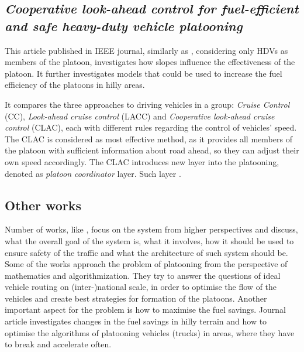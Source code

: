 \subsection{\textit{Cooperative look-ahead control for fuel-efficient and safe heavy-duty vehicle platooning}}
% 
This article \cite{Turri2016CooperativePlatooning} published in IEEE journal, similarly as \cite{Alam2014Fuel-efficientPlatooning}, considering only HDVs as members of the platoon, investigates how slopes influence the effectiveness of the platoon. It further investigates models that could be used to increase the fuel efficiency of the platoons in hilly areas.
\par
% 
It compares the three approaches to driving vehicles in a group: \emph{Cruise Control} (CC), \emph{Look-ahead cruise control} (LACC) and \emph{Cooperative look-ahead cruise control} (CLAC), each with different rules regarding the control of vehicles' speed. The CLAC is considered as most effective method, as it provides all members of the platoon with sufficient information about road ahead, so they can adjust their own speed accordingly. The CLAC introduces new layer into the platooning, denoted as \emph{platoon coordinator} layer. Such layer .
\par
% 
% 
% 
\subsection{Other works}
% 
Number of works, like \cite{Alvarez1997SafeSystems}, \cite{Nowakowski2015CooperativeAlternatives} focus on the system from higher perspectives and discuss, what the overall goal of the system is, what it involves, how it should be used to ensure safety of the traffic and what the architecture of such system should be. Some of the works \cite{Larsson2015TheHeuristics}
approach the problem of platooning from the perspective of mathematics and algorithmization. They try to answer the questions of ideal vehicle routing on (inter-)national scale, in order to optimise the flow of the vehicles and create best strategies for formation of the platoons.
Another important aspect for the problem is how to maximise the fuel savings. Journal article \cite{Turri2016CooperativePlatooning} investigates changes in the fuel savings in hilly terrain and how to optimise the algorithms of platooning vehicles (trucks) in areas, where they have to break and accelerate often.\par
% 
